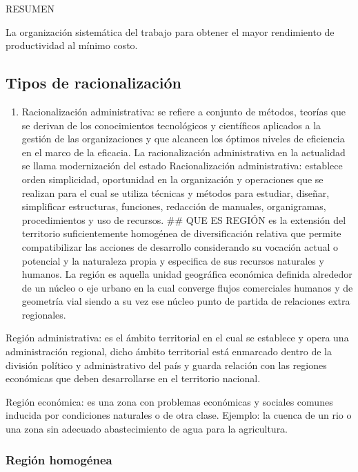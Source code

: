 \documentclass[
  a4paper,
]{article}
\providecommand{\tightlist}{%
  \setlength{\itemsep}{0pt}\setlength{\parskip}{0pt}}\usepackage{longtable,booktabs,array}
\begin{document}
RESUMEN

La organización sistemática del trabajo para obtener el mayor
rendimiento de productividad al mínimo costo.

\subsection{Tipos de racionalización}\label{tipos-de-racionalizaciuxf3n}

\begin{enumerate}
\def\labelenumi{\arabic{enumi}.}
\tightlist
\item
  Racionalización administrativa: se refiere a conjunto de métodos,
  teorías que se derivan de los conocimientos tecnológicos y científicos
  aplicados a la gestión de las organizaciones y que alcancen los
  óptimos niveles de eficiencia en el marco de la eficacia. La
  racionalización administrativa en la actualidad se llama modernización
  del estado Racionalización administrativa: establece orden
  simplicidad, oportunidad en la organización y operaciones que se
  realizan para el cual se utiliza técnicas y métodos para estudiar,
  diseñar, simplificar estructuras, funciones, redacción de manuales,
  organigramas, procedimientos y uso de recursos. \#\# QUE ES REGIÓN es
  la extensión del territorio suficientemente homogénea de
  diversificación relativa que permite compatibilizar las acciones de
  desarrollo considerando su vocación actual o potencial y la naturaleza
  propia y especifica de sus recursos naturales y humanos. La región es
  aquella unidad geográfica económica definida alrededor de un núcleo o
  eje urbano en la cual converge flujos comerciales humanos y de
  geometría vial siendo a su vez ese núcleo punto de partida de
  relaciones extra regionales.
\end{enumerate}

Región administrativa: es el ámbito territorial en el cual se establece
y opera una administración regional, dicho ámbito territorial está
enmarcado dentro de la división político y administrativo del país y
guarda relación con las regiones económicas que deben desarrollarse en
el territorio nacional.

Región económica: es una zona con problemas económicas y sociales
comunes inducida por condiciones naturales o de otra clase. Ejemplo: la
cuenca de un rio o una zona sin adecuado abastecimiento de agua para la
agricultura.

\subsubsection{Región homogénea}\label{regiuxf3n-homoguxe9nea}
\end{document}
